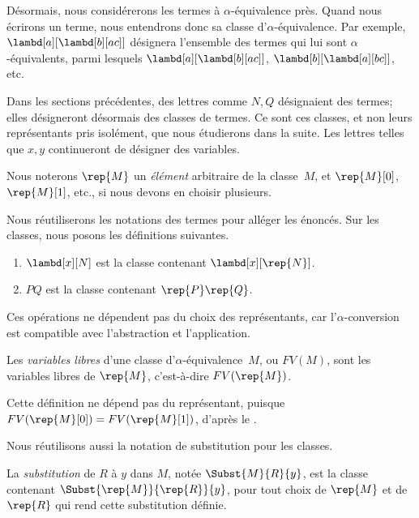 \documentclass[../../../include/open-logic-section]{subfiles}
\begin{document}

Désormais, nous considérerons les termes à
$\alpha$-équivalence près. Quand nous écrirons
un terme, nous entendrons donc sa classe
d'$\alpha$-équivalence. Par exemple,
$\lambd[a][\lambd[b][a c]]$ désignera
l'ensemble des termes qui lui sont
$\alpha$-équivalents, parmi lesquels
$\lambd[a][\lambd[b][a c]]$,
$\lambd[b][\lambd[a][b c]]$, etc.

Dans les sections précédentes, des lettres
comme $N, Q$ désignaient des termes; elles
désigneront désormais des classes de termes.
Ce sont ces classes, et non leurs représentants
pris isolément, que nous étudierons dans la
suite. Les lettres telles que $x, y$
continueront de désigner des variables.

Nous noterons $\rep{M}$ un \emph{élément}
arbitraire de la classe~$M$, et
$\rep{M}[0]$, $\rep{M}[1]$, etc.,
si nous devons en choisir plusieurs.

Nous réutiliserons les notations des termes
pour alléger les énoncés. Sur les classes,
nous posons les définitions suivantes.
\begin{defn}
\begin{enumerate}
\item $\lambd[x][N]$ est la classe contenant
  $\lambd[x][\rep{N}]$.
\item $PQ$ est la classe contenant
  $\rep{P}\rep{Q}$.
\end{enumerate}
\end{defn}

Ces opérations ne dépendent pas du choix
des représentants, car
l'$\alpha$-conversion est compatible avec
l'abstraction et l'application.

\begin{defn} 
Les \emph{variables libres} d'une classe
d'$\alpha$-équivalence~$M$, ou $FV(M)$,
sont les variables libres de $\rep{M}$,
c'est-à-dire $FV(\rep{M})$.
\end{defn}

Cette définition ne dépend pas du représentant,
puisque $FV(\rep{M}[0]) =
FV(\rep{M}[1])$, d'après le
.

Nous réutilisons aussi la notation de
substitution pour les classes.
\begin{defn} 
La \emph{substitution} de $R$ à $y$ dans $M$,
notée $\Subst{M}{R}{y}$, est la classe
contenant $\Subst{{\rep{M}}}{\rep{R}}{y}$,
pour tout choix de $\rep{M}$ et de
$\rep{R}$ qui rend cette substitution définie.
\end{defn}
\end{document}
